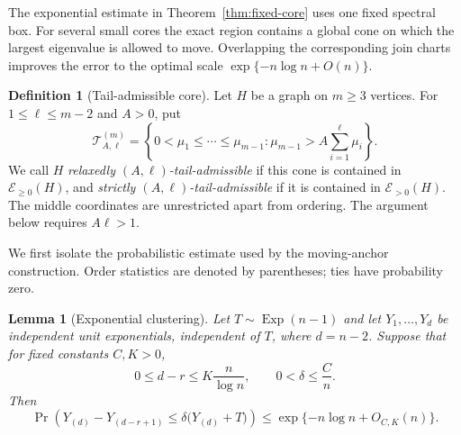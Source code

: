 \documentclass[11pt,reqno]{amsart}
\newtheorem{lemma}[theorem]{Lemma}
\theoremstyle{definition}
\newtheorem{definition}[theorem]{Definition}
\theoremstyle{remark}
\begin{document}
The exponential estimate in Theorem~\ref{thm:fixed-core} uses one fixed
spectral box.  For several small cores the exact region contains a global
cone on which the largest eigenvalue is allowed to move.  Overlapping the
corresponding join charts improves the error to the optimal scale
$\exp\{-n\log n+O(n)\}$.

\begin{definition}[Tail-admissible core]\label{def:tail-admissible}
Let $H$ be a graph on $m\ge3$ vertices.  For
$1\le\ell\le m-2$ and $A>0$, put
\[
  \mathcal T_{A,\ell}^{(m)}=
  \left\{0<\mu_1\le\cdots\le\mu_{m-1}:
    \mu_{m-1}>A\sum_{i=1}^{\ell}\mu_i\right\}.
\]
We call $H$ \emph{relaxedly $(A,\ell)$-tail-admissible} if this cone is
contained in $\mathcal E_{\ge0}(H)$, and \emph{strictly
$(A,\ell)$-tail-admissible} if it is contained in
$\mathcal E_{>0}(H)$.  The middle coordinates are unrestricted apart from
ordering.  The argument below requires $A\ell>1$.
\end{definition}

We first isolate the probabilistic estimate used by the moving-anchor
construction.  Order statistics are denoted by parentheses; ties have
probability zero.

\begin{lemma}[Exponential clustering]\label{lem:exponential-clustering}
Let $T\sim\operatorname{Exp}(n-1)$ and let
$Y_1,\ldots,Y_d$ be independent unit exponentials, independent of $T$, where
$d=n-2$.  Suppose that for fixed constants $C,K>0$,
\[
  0\le d-r\le K\frac n{\log n},
  \qquad 0<\delta\le\frac Cn.
\]
Then
\begin{equation}\label{eq:clustering-bound}
  \Pr\left(Y_{(d)}-Y_{(d-r+1)}
    \le\delta\bigl(Y_{(d)}+T\bigr)\right)
  \le\exp\{-n\log n+O_{C,K}(n)\}.
\end{equation}
\end{lemma}
\end{document}
